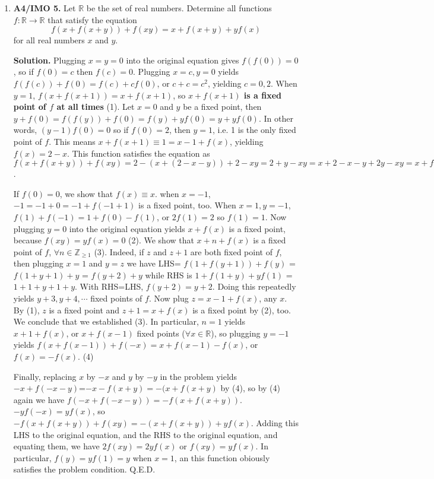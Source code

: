 \documentclass[11pt,a4paper]{article}
\begin{document}
\begin{enumerate}
\item\textbf{A4/IMO 5.} Let $\mathbb R$ be the set of real numbers. Determine all functions $f:\mathbb R\to\mathbb R$ that satisfy the equation\[f(x+f(x+y))+f(xy)=x+f(x+y)+yf(x)\]for all real numbers $x$ and $y$.

\textbf{Solution.} Plugging $x=y=0$ into the original equation gives $f(f(0))=0$, so if $f(0)=c$ then $f(c)=0$. Plugging $x=c, y=0$ yields $f(f(c))+f(0)=f(c)+cf(0)$, or $c+c=c^2$, yielding $c=0,2$. When $y=1$, $f(x+f(x+1))=x+f(x+1)$, so \textbf{$x+f(x+1)$ is a fixed point of $f$ at all times} (1). Let $x=0$ and $y$ be a fixed point, then $y+f(0)=f(f(y))+f(0)=f(y)+yf(0)=y+yf(0)$. In other words, $(y-1)f(0)=0$ so if $f(0)=2$, then $y=1$, i.e. 1 is the only fixed point of $f$. This means $x+f(x+1)\equiv 1=x-1+f(x)$, yielding $f(x)=2-x$. This function satisfies the equation as $f(x+f(x+y))+f(xy)=2-(x+(2-x-y))+2-xy=2+y-xy=x+2-x-y+2y-xy=x+f(x+y)+yf(x)$.

If $f(0)=0$, we show that $f(x)\equiv x$. when $x=-1$, $-1=-1+0=-1+f(-1+1)$ is a fixed point, too. When $x=1, y=-1$, $f(1)+f(-1)=1+f(0)-f(1)$, or $2f(1)=2$ so $f(1)=1$. Now plugging $y=0$ into the original equation yields $x+f(x)$ is a fixed point, because $f(xy)=yf(x)=0$ (2). We show that $x+n+f(x)$ is a fixed point of $f$, $\forall n\in\mathbb{Z}_{\ge 1}$ (3). Indeed, if $z$ and $z+1$ are both fixed point of $f$, then plugging $x=1$ and $y=z$ we have LHS= $f(1+f(y+1))+f(y)$ = $f(1+y+1)+y$ = $f(y+2)+y$ while RHS is $1+f(1+y)+yf(1)$ = $1+1+y+1+y$. With RHS=LHS, $f(y+2)=y+2$. Doing this repeatedly yields $y+3, y+4,\cdots $ fixed points of $f$. Now plug $z=x-1+f(x)$, any $x$. By (1), $z$ is a fixed point and $z+1=x+f(x)$ is a fixed point by (2), too. We conclude that we established (3). In particular, $n=1$ yields $x+1+f(x)$, or $x+f(x-1)$ fixed points ($\forall x\in\mathbb{R}$), so plugging $y=-1$ yields $f(x+f(x-1))+f(-x)=x+f(x-1)-f(x)$, or $f(x)=-f(x)$. (4)

Finally, replacing $x$ by $-x$ and $y$ by $-y$ in the problem yields $-x+f(-x-y)$=$-x-f(x+y)=-(x+f(x+y)$ by (4), so by (4) again we have $f(-x+f(-x-y))=-f(x+f(x+y))$. $-yf(-x)=yf(x)$, so $-f(x+f(x+y))+f(xy)=-(x+f(x+y))+yf(x)$. Adding this LHS to the original equation, and the RHS to the original equation, and equating them, we have $2f(xy)=2yf(x)$ or $f(xy)=yf(x)$. In particular, $f(y)=yf(1)=y$ when $x=1$, an this function obiously satisfies the problem condition. Q.E.D.

\end{enumerate}
\end{document}
